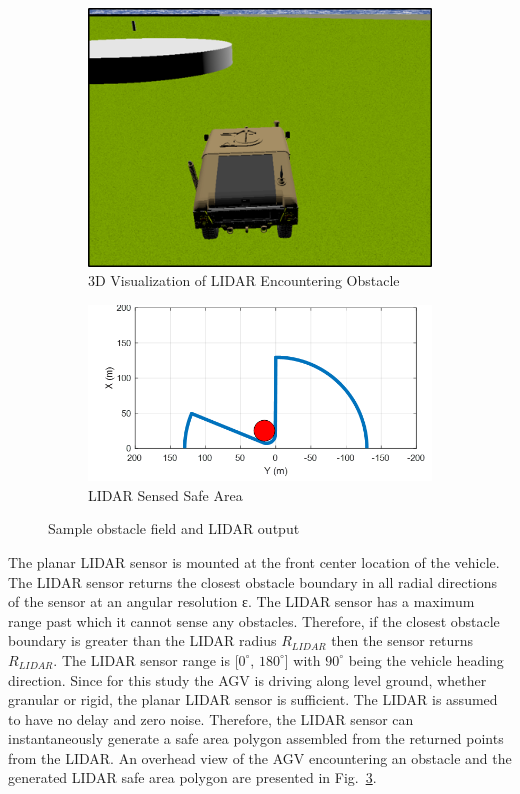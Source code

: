 \documentclass[12pt,twocolumn]{article}
\begin{document}
\begin{figure}
	\centering
	\begin{subfigure}[b]{\columnwidth}
		\centering
		\includegraphics[width=0.8\columnwidth]{Figs/incomingObst.png}
		\caption{{\small 3D Visualization of LIDAR Encountering Obstacle}}   
		\label{fig:obstacle_field_3D}
	\end{subfigure}

	\hfill
	\begin{subfigure}[b]{\columnwidth}
		\centering
		\includegraphics[width=\columnwidth]{Figs/obstLIDAR.png}
		\caption{\small LIDAR Sensed Safe Area}   
		\label{fig:obstacle_field_LIDAR}
	\end{subfigure}
	\caption{\small Sample obstacle field and LIDAR output}
	\label{fig:LIDARExample}
\end{figure}

The planar LIDAR sensor is mounted at the front center location of the vehicle. The LIDAR sensor returns the closest obstacle boundary in all radial directions of the sensor at an angular resolution ε. The LIDAR sensor has a maximum range past which it cannot sense any obstacles. Therefore, if the closest obstacle boundary is greater than the LIDAR radius $R_{LIDAR}$ then the sensor returns $R_{LIDAR}$. The LIDAR sensor range is [$0^\circ$, $180^\circ$] with $90^\circ$ being the vehicle heading direction. Since for this study the AGV is driving along level ground, whether granular or rigid, the planar LIDAR sensor is sufficient. The LIDAR is assumed to have no delay and zero noise. Therefore, the LIDAR sensor can instantaneously generate a safe area polygon assembled from the returned points from the LIDAR. An overhead view of the AGV encountering an obstacle and the generated LIDAR safe area polygon are presented in Fig.~\ref{fig:LIDARExample}. 
%
\end{document}
